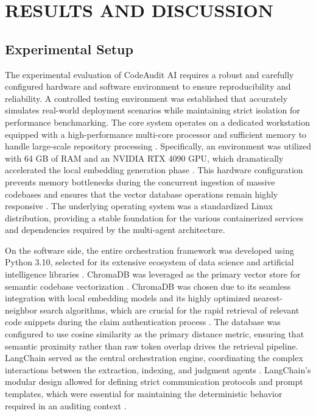 \chapter{RESULTS AND DISCUSSION}

\section{Experimental Setup}

The experimental evaluation of CodeAudit AI requires a robust and carefully configured hardware and software environment to ensure reproducibility and reliability. A controlled testing environment was established that accurately simulates real-world deployment scenarios while maintaining strict isolation for performance benchmarking. The core system operates on a dedicated workstation equipped with a high-performance multi-core processor and sufficient memory to handle large-scale repository processing \cite{ref50, ref11}. Specifically, an environment was utilized with 64 GB of RAM and an NVIDIA RTX 4090 GPU, which dramatically accelerated the local embedding generation phase \cite{ref48}. This hardware configuration prevents memory bottlenecks during the concurrent ingestion of massive codebases and ensures that the vector database operations remain highly responsive \cite{ref3}. The underlying operating system was a standardized Linux distribution, providing a stable foundation for the various containerized services and dependencies required by the multi-agent architecture.

On the software side, the entire orchestration framework was developed using Python 3.10, selected for its extensive ecosystem of data science and artificial intelligence libraries \cite{ref46, ref16}. ChromaDB was leveraged as the primary vector store for semantic codebase vectorization \cite{ref5}. ChromaDB was chosen due to its seamless integration with local embedding models and its highly optimized nearest-neighbor search algorithms, which are crucial for the rapid retrieval of relevant code snippets during the claim authentication process \cite{ref27}. The database was configured to use cosine similarity as the primary distance metric, ensuring that semantic proximity rather than raw token overlap drives the retrieval pipeline. LangChain served as the central orchestration engine, coordinating the complex interactions between the extraction, indexing, and judgment agents \cite{ref26}. LangChain's modular design allowed for defining strict communication protocols and prompt templates, which were essential for maintaining the deterministic behavior required in an auditing context \cite{ref47}. 

